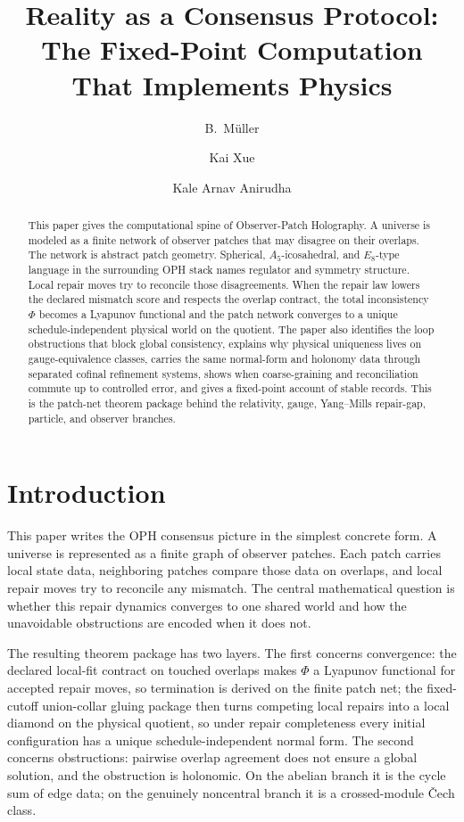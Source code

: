 \documentclass[11pt]{article}
\title{Reality as a Consensus Protocol:\\
The Fixed-Point Computation That Implements Physics}
\author{B.\ M\"uller \and Kai Xue \and Kale Arnav Anirudha}
\date{\OPHPaperReleaseDate}
\theoremstyle{remark}
\theoremstyle{plain}
\begin{document}
\maketitle
\OPHPaperReleaseBanner

\begin{abstract}
This paper gives the computational spine of Observer-Patch Holography. A universe is modeled as a finite network of observer patches that may disagree on their overlaps. The network is abstract patch geometry. Spherical, \(A_5\)-icosahedral, and \(E_8\)-type language in the surrounding OPH stack names regulator and symmetry structure. Local repair moves try to reconcile those disagreements. When the repair law lowers the declared mismatch score and respects the overlap contract, the total inconsistency \(\Phi\) becomes a Lyapunov functional and the patch network converges to a unique schedule-independent physical world on the quotient. The paper also identifies the loop obstructions that block global consistency, explains why physical uniqueness lives on gauge-equivalence classes, carries the same normal-form and holonomy data through separated cofinal refinement systems, shows when coarse-graining and reconciliation commute up to controlled error, and gives a fixed-point account of stable records. This is the patch-net theorem package behind the relativity, gauge, Yang--Mills repair-gap, particle, and observer branches.
\end{abstract}

\section{Introduction}

This paper writes the OPH consensus picture in the simplest concrete form. A universe is represented as a finite graph of observer patches. Each patch carries local state data, neighboring patches compare those data on overlaps, and local repair moves try to reconcile any mismatch. The central mathematical question is whether this repair dynamics converges to one shared world and how the unavoidable obstructions are encoded when it does not.

The resulting theorem package has two layers. The first concerns convergence: the declared
local-fit contract on touched overlaps makes \(\Phi\) a Lyapunov functional for accepted repair
moves, so termination is derived on the finite patch net; the fixed-cutoff union-collar gluing
package then turns competing local repairs into a local diamond on the physical quotient, so
under repair completeness every initial configuration has a unique schedule-independent normal
form. The second concerns obstructions: pairwise overlap agreement does not ensure a
global solution, and the obstruction is holonomic. On the abelian branch it is the cycle sum of
edge data; on the genuinely noncentral branch it is a crossed-module \v{C}ech class.
\end{document}

